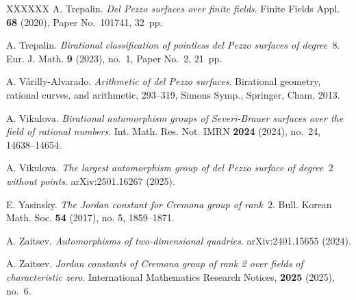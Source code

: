 \documentclass[12pt]{amsart}
\theoremstyle{definition}
\theoremstyle{remark}
\begin{document}
\begin{thebibliography}{XXXXXX}
A. Trepalin. \emph{Del Pezzo surfaces over finite fields}.
Finite Fields Appl. \textbf{68} (2020), Paper No.~101741, 32~pp.

A. Trepalin. \emph{Birational classification of pointless del Pezzo surfaces of degree~$8$}.
Eur. J. Math. \textbf{9} (2023), no.~1, Paper No.~2, 21~pp.


A. V\'arilly-Alvarado. \emph{Arithmetic of del Pezzo surfaces}.
Birational geometry, rational curves, and arithmetic, 293--319,
Simons Symp., Springer, Cham, 2013.

A. Vikulova. \emph{Birational automorphism groups of Severi-Brauer surfaces over the field of rational numbers}.
Int. Math. Res. Not. IMRN \textbf{2024} (2024), no.~24, 14638--14654.

A. Vikulova. \emph{The largest automorphism group of del Pezzo surface of degree~$2$ without points}.
arXiv:2501.16267 (2025).

E. Yasinsky. \emph{The Jordan constant for Cremona group of rank~$2$}.
Bull. Korean Math. Soc. \textbf{54} (2017), no. 5, 1859--1871.

A. Zaitsev. \emph{Automorphisms of two-dimensional quadrics}.
arXiv:2401.15655 (2024).

A. Zaitsev. \emph{Jordan constants of Cremona group of rank 2 over fields of characteristic zero}.
International Mathematics Research Notices, \textbf{2025} (2025), no.~6.

\end{thebibliography}
\end{document}
